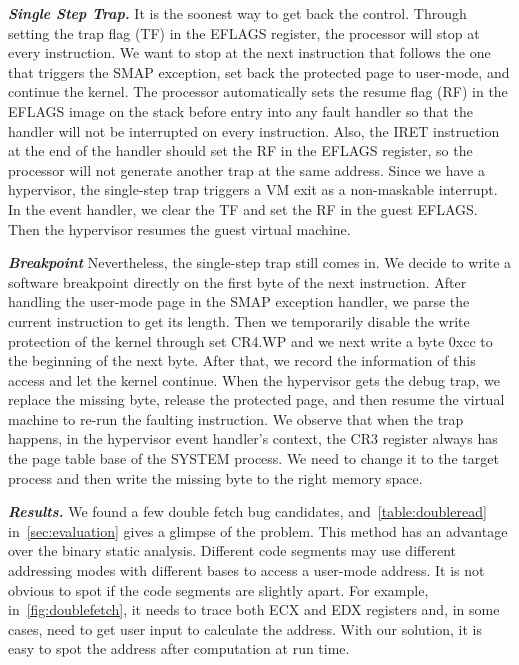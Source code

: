 \textbf{\textit{Single Step Trap.}} It is the soonest way to get back the control. Through setting the trap flag (TF) in the EFLAGS register, the processor will stop at every instruction. We want to stop at the next instruction that follows the one that triggers the SMAP exception, set back the protected page to user-mode, and continue the kernel. The processor automatically sets the resume flag (RF) in the EFLAGS image on the stack before entry into any fault handler so that the handler will not be interrupted on every instruction. Also, the IRET instruction at the end of the handler should set the RF in the EFLAGS register, so the processor will not generate another trap at the same address. Since we have a hypervisor, the single-step trap triggers a VM exit as a non-maskable interrupt. In the event handler, we clear the TF and set the RF in the guest EFLAGS. Then the hypervisor resumes the guest virtual machine.

\textbf{\textit{Breakpoint}} Nevertheless, the single-step trap still comes in. We decide to write a software breakpoint directly on the first byte of the next instruction. After handling the user-mode page in the SMAP exception handler, we parse the current instruction to get its length. Then we temporarily disable the write protection of the kernel through set CR4.WP and we next write a byte 0xcc to the beginning of the next byte. After that, we record the information of this access and let the kernel continue. When the hypervisor gets the debug trap, we replace the missing byte, release the protected page, and then resume the virtual machine to re-run the faulting instruction. We observe that when the trap happens, in the hypervisor event handler's context, the CR3 register always has the page table base of the SYSTEM process. We need to change it to the target process and then write the missing byte to the right memory space.

\textbf{\textit{Results.}} 
We found a few double fetch bug candidates, and~\autoref{table:doubleread} in~\autoref{sec:evaluation} gives a glimpse of the problem. This method has an advantage over the binary static analysis. Different code segments may use different addressing modes with different bases to access a user-mode address.  It is not obvious to spot if the code segments are slightly apart. For example, in~\autoref{fig:doublefetch}, it needs to trace both ECX and EDX registers and, in some cases, need to get user input to calculate the address. With our solution, it is easy to spot the address after computation at run time.

